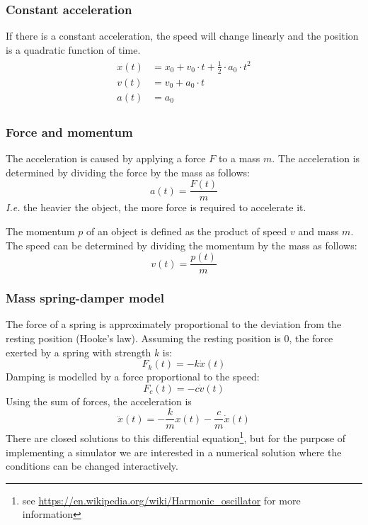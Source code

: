 \documentclass[12pt,a4paper,twoside]{article}
\begin{document}
\subsubsection{Constant acceleration}
If there is a constant acceleration, the speed will change linearly and the position is a quadratic function of time.
\begin{align*}
  \begin{split}
    x(t) & = x_0 + v_0 \cdot t + \frac{1}{2} \cdot a_0 \cdot t^2\\
    v(t) & = v_0 + a_0 \cdot t\\
    a(t) & = a_0
  \end{split}
\end{align*}

\subsubsection{Force and momentum}
The acceleration is caused by applying a force $F$ to a mass $m$.
The acceleration is determined by dividing the force by the mass as follows:
\begin{equation*}
  a(t)=\frac{F(t)}{m}
\end{equation*}
\emph{I.e.} the heavier the object, the more force is required to accelerate it.

The momentum $p$ of an object is defined as the product of speed $v$ and mass $m$.
The speed can be determined by dividing the momentum by the mass as follows:
\begin{equation*}
  v(t)=\frac{p(t)}{m}
\end{equation*}

\subsubsection{Mass spring-damper model}
The force of a spring is approximately proportional to the deviation from the resting position (Hooke's law).
Assuming the resting position is $0$, the force exerted by a spring with strength $k$ is:
\begin{equation*}
  F_k(t)=-k \dot x(t)
\end{equation*}
Damping is modelled by a force proportional to the speed:
\begin{equation*}
  F_c(t)=-c \dot v(t)
\end{equation*}
Using the sum of forces, the acceleration is
\begin{equation*}
  \ddot{x}(t) = -\frac{k}{m} x(t) - \frac{c}{m}\dot{x}(t)
\end{equation*}
There are closed solutions to this differential equation\footnote{see \url{https://en.wikipedia.org/wiki/Harmonic_oscillator} for more information}, but for the purpose of implementing a simulator we are interested in a numerical solution where the conditions can be changed interactively.
\end{document}
